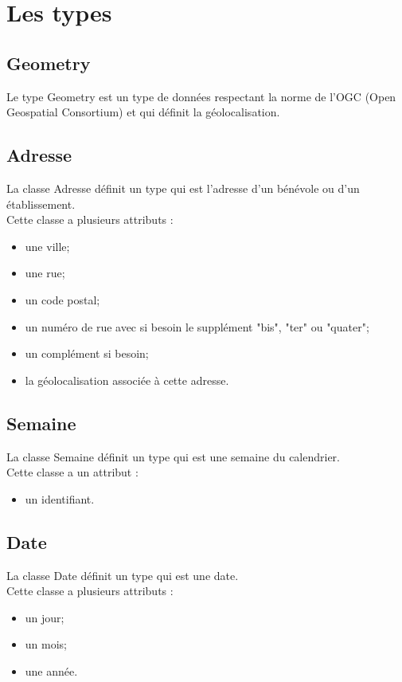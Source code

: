 \documentclass[asi, sansVersion]{picInsa}
\begin{document}
\section{Les types}

\subsection*{Geometry}

Le type Geometry est un type de données respectant la norme de l'OGC (Open Geospatial Consortium) et qui définit la géolocalisation.

\subsection*{Adresse}

La classe Adresse définit un type qui est l'adresse d'un bénévole ou d'un établissement.\\
Cette classe a plusieurs attributs : 
\begin{itemize}
\item une ville;
\item une rue;
\item un code postal;
\item un numéro de rue avec si besoin le supplément "bis", "ter" ou "quater";
\item un complément si besoin;
\item la géolocalisation associée à cette adresse.
\end{itemize}

\subsection*{Semaine}

La classe Semaine définit un type qui est une semaine du calendrier.\\
Cette classe a un attribut : 
\begin{itemize}
\item un identifiant.
\end{itemize}

\subsection*{Date}

La classe Date définit un type qui est une date.\\
Cette classe a plusieurs attributs : 
\begin{itemize}
\item un jour;
\item un mois;
\item une année.
\end{itemize}
\end{document}
